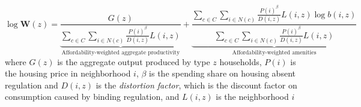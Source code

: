 \documentclass[11pt]{article}
\begin{document}
\begin{equation}
	\log \boldsymbol{W}(z) =  \underbrace{ \frac{G(z)}{\sum_{c \in C}\sum_{i \in N(c)}\frac{P(i)^{\beta}}{D(i, z)}L(i, z)} }_{\text{Affordability-weighted aggregate productivity}} + \underbrace{ \frac{\sum_{c \in C}\sum_{i \in N(c)}\frac{P(i)^{\beta}}{D(i, z)}L(i, z) \log b(i, z)}{\sum_{c \in C}\sum_{i \in N(c)}\frac{P(i)^{\beta}}{D(i, z)}L(i, z)} }_{\text{Affordability-weighted amenities}}
\end{equation}
where $G(z)$ is the aggregate output produced by type $z$ households, $P(i)$ is the housing price in neighborhood $i$, $\beta$ is the spending share on housing absent regulation and $D(i, z)$ is the \textit{distortion factor}, which is the discount factor on consumption caused by binding regulation, and $L(i, z)$ is the neighborhood $i$
\end{document}

